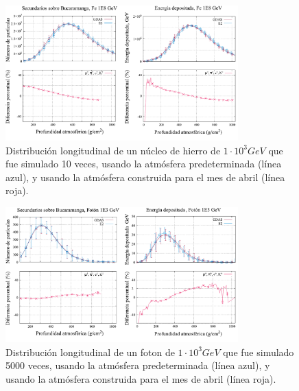 \begin{figure}[htb!]
\centering
\includegraphics[width=0.8\textwidth]{Figs/fe_1E8.pdf}
\caption[Distribución longitudinal de un núcleo de hierro de $1\cdot 10^{8}$ GeV.]{Distribución longitudinal de un núcleo de hierro de $1\cdot 10^{3} GeV$ que fue simulado 10 veces, usando la atmósfera predeterminada (línea azul), y usando la atmósfera construida para el mes de abril (línea roja). }
\label{fig:fig29}
\end{figure}

\begin{figure}[htb!]
\centering
\includegraphics[width=0.8\textwidth]{Figs/foton_1E3.pdf}
\caption[Distribución longitudinal de un fotón de $1\cdot 10^{3}$ GeV.]{Distribución longitudinal de un foton de $1\cdot 10^{3} GeV$ que fue simulado 5000 veces, usando la atmósfera predeterminada (línea azul), y usando la atmósfera construida para el mes de abril (línea roja).}
\label{fig:fig30}
\end{figure}

